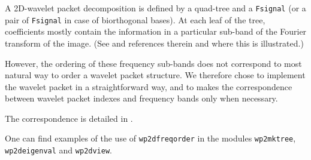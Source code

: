 A 2D-wavelet packet decomposition is defined by a quad-tree and a \verb+Fsignal+ (or
a pair of \verb+Fsignal+ in case of biorthogonal bases).  
At each leaf of the tree,  coefficients
mostly contain the information in a particular sub-band of
the Fourier transform of the image. (See \cite{mallat:wavelet} and
references therein and \cite{malgouyres:framework} where this is
illustrated.) 

However, the ordering of these frequency sub-bands does not correspond
to most natural way to order a wavelet packet structure. We therefore
chose to implement the wavelet packet in a straightforward way, and to
makes the correspondence between wavelet packet indexes and frequency
bands only when necessary.

The correspondence is detailed in \cite{mallat:wavelet}.

One can find examples of the use of \verb+wp2dfreqorder+ in the
modules \verb+wp2mktree+, \verb+wp2deigenval+ and \verb+wp2dview+.
